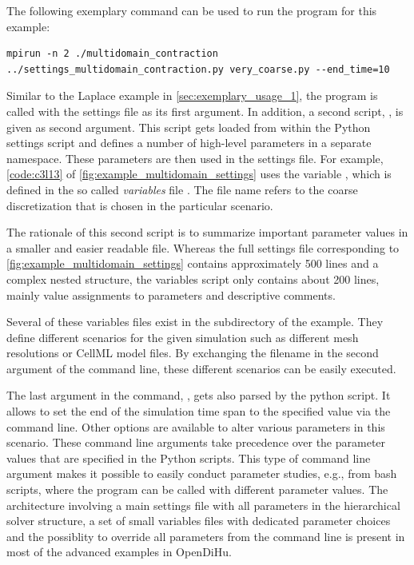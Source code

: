 The following exemplary command can be used to run the program for this example:
\begin{lstlisting}[columns=fullflexible,breaklines=true,postbreak=\mbox{\textcolor{gray}{$\hookrightarrow$}\space}]
  mpirun -n 2 ./multidomain_contraction ../settings_multidomain_contraction.py very_coarse.py --end_time=10
\end{lstlisting}
Similar to the Laplace example in \cref{sec:exemplary_usage_1}, the program  is called with the settings file  as its first argument. In addition, a second script, , is given as second argument. This script gets loaded from within the Python settings script and defines a number of high-level parameters in a separate  namespace. These parameters are then used in the settings file. For example, \cref{code:c3l13} of \cref{fig:example_multidomain_settings} uses the variable , which is defined in the so called \emph{variables} file . The file name refers to the coarse discretization that is chosen in the particular scenario.

The rationale of this second script is to summarize important parameter values in a smaller and easier readable file. Whereas the full settings file corresponding to \cref{fig:example_multidomain_settings} contains approximately 500 lines and a complex nested structure, the variables script only contains about 200 lines, mainly value assignments to parameters and descriptive comments. 

Several of these variables files exist in the  subdirectory of the example. They define different scenarios for the given simulation such as different mesh resolutions or CellML model files. By exchanging the filename in the second argument of the command line, these different scenarios can be easily executed.

The last argument in the command, , gets also parsed by the python script. It allows to set the end of the simulation time span to the specified value via the command line. Other options are available to alter various parameters in this scenario. These command line arguments take precedence over the parameter values that are specified in the Python scripts. This type of command line argument makes it possible to easily conduct parameter studies, e.g., from bash scripts, where the program can be called with different parameter values.
The architecture involving a main settings file with all parameters in the hierarchical solver structure, a set of small variables files with dedicated parameter choices and the possiblity to override all parameters from the command line is present in most of the advanced examples in OpenDiHu.

